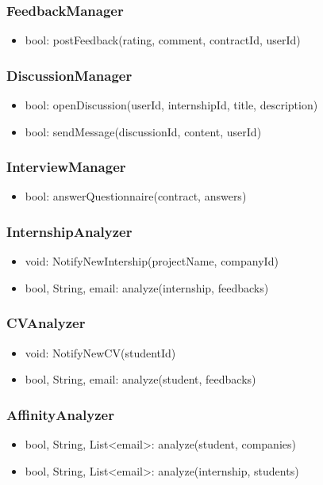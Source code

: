 \subsubsection{FeedbackManager}
\begin{itemize}
    \item bool: postFeedback(rating, comment, contractId, userId)
\end{itemize}
\subsubsection{DiscussionManager}
\begin{itemize}
    \item bool: openDiscussion(userId, internshipId, title, description)
    \item bool: sendMessage(discussionId, content, userId)
\end{itemize}
\subsubsection{InterviewManager}
\begin{itemize}
    \item bool: answerQuestionnaire(contract, answers)
\end{itemize}
\subsubsection{InternshipAnalyzer}
\begin{itemize}
    \item void: NotifyNewIntership(projectName, companyId)
    \item {bool, String, email}: analyze(internship, feedbacks)
\end{itemize}
\subsubsection{CVAnalyzer}
\begin{itemize}
    \item void: NotifyNewCV(studentId)
    \item {bool, String, email}: analyze(student, feedbacks)
\end{itemize}
\subsubsection{AffinityAnalyzer}
\begin{itemize}
    \item {bool, String, List<email>}: analyze(student, companies)
    \item {bool, String, List<email>}: analyze(internship, students)
\end{itemize}
